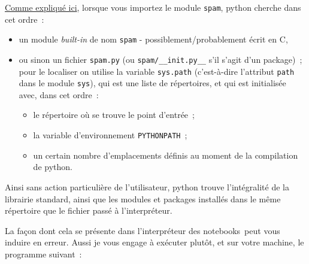     \href{https://docs.python.org/3/tutorial/modules.html\#the-module-search-path}{Comme
expliqué ici}, lorsque vous importez le module \texttt{spam}, python
cherche dans cet ordre~:

\begin{itemize}
\tightlist
\item
  un module \emph{built-in} de nom \texttt{spam} -
  possiblement/probablement écrit en C,
\item
  ou sinon un fichier \texttt{spam.py} (ou \texttt{spam/\_\_init.py\_\_}
  s'il s'agit d'un package)~; pour le localiser on utilise la variable
  \texttt{sys.path} (c'est-à-dire l'attribut \texttt{path} dans le
  module \texttt{sys}), qui est une liste de répertoires, et qui est
  initialisée avec, dans cet ordre~:

  \begin{itemize}
  \tightlist
  \item
    le répertoire où se trouve le point d'entrée~;
  \item
    la variable d'environnement \texttt{PYTHONPATH}~;
  \item
    un certain nombre d'emplacements définis au moment de la compilation
    de python.
  \end{itemize}
\end{itemize}

    Ainsi sans action particulière de l'utilisateur, python trouve
l'intégralité de la librairie standard, ainsi que les modules et
packages installés dans le même répertoire que le fichier passé à
l'interpréteur.

    La façon dont cela se présente dans l'interpréteur des notebooks~peut
vous induire en erreur. Aussi je vous engage à exécuter plutôt, et sur
votre machine, le programme suivant~:

